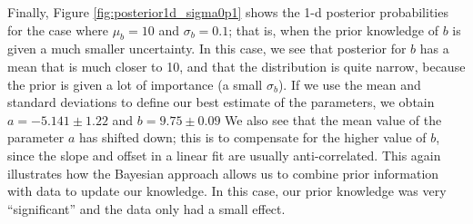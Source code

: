 
Finally, Figure \ref{fig:posterior1d_sigma0p1} shows the 1-d posterior probabilities for the case where $\mu_b=10$ and $\sigma_b=0.1$; that is, when the prior knowledge of $b$ is given a much smaller uncertainty. In this case, we see that posterior for $b$ has a mean that is much closer to 10, and that the distribution is quite narrow, because the prior is given a lot of importance (a small $\sigma_b$). If we use the mean and standard deviations to define our best estimate of the parameters, we obtain $a=-5.141\pm1.22$ and $b=9.75 \pm 0.09$ We also see that the mean value of the parameter $a$ has shifted down; this is to compensate for the higher value of $b$, since the slope and offset in a linear fit are usually anti-correlated. This again illustrates how the Bayesian approach allows us to combine prior information with data to update our knowledge. In this case, our prior knowledge was very ``significant'' and the data only had a small effect.

